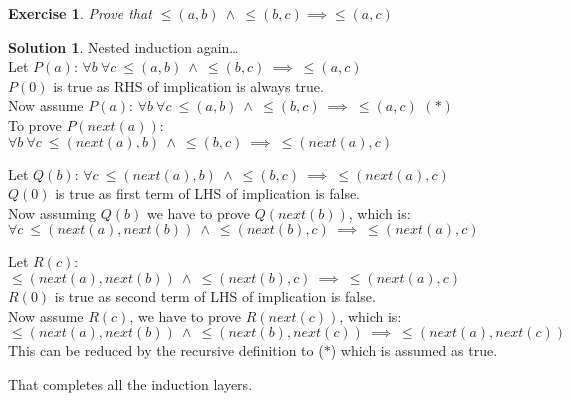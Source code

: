 \documentclass[a4paper,10pt]{article}
\newtheorem{exercise}{Exercise}[section]
\theoremstyle{definition} %
\newtheorem*{solution}{Solution}
\begin{document}
    \begin{exercise}
        Prove that $\leq(a,b) \ \land \ \leq(b,c) \implies \leq(a,c)$
    \end{exercise}
    \begin{solution}
        Nested induction again\dots \\
        Let $P(a)$: $\forall b \ \forall c \ \leq(a,b) \ \land \ \leq(b,c) \ \implies \ \leq(a,c)$ \\
        $P(0)$ is true as RHS of implication is always true. \\
        Now assume $P(a)$: $\forall b \ \forall c \ \leq(a,b) \ \land \ \leq(b,c) \ \implies \ \leq(a,c)$ \quad $(\ast)$ \\
        To prove $P(next(a))$: $\forall b \ \forall c \ \leq(next(a),b) \ \land \ \leq(b,c) \ \implies \ \leq(next(a),c)$
        \begin{adjustwidth}{1cm}{0cm}
            Let $Q(b)$: $\forall c \ \leq(next(a),b) \ \land \ \leq(b,c) \ \implies \ \leq(next(a),c)$ \\
            $Q(0)$ is true as first term of LHS of implication is false. \\
            Now assuming $Q(b)$ we have to prove $Q(next(b))$, which is: \\
            $\forall c \ \leq(next(a),next(b)) \ \land \ \leq(next(b),c) \ \implies \ \leq(next(a),c)$
            \begin{adjustwidth}{1cm}{0cm}
                Let $R(c)$: $\leq(next(a),next(b)) \ \land \ \leq(next(b),c) \ \implies \ \leq(next(a),c)$ \\
                $R(0)$ is true as second term of LHS of implication is false. \\
                Now assume $R(c)$, we have to prove $R(next(c))$, which is: \\
                $\leq(next(a),next(b)) \ \land \ \leq(next(b),next(c)) \ \implies \ \leq(next(a),next(c))$ \\
                This can be reduced by the recursive definition to ($\ast$) which is assumed as true.
            \end{adjustwidth} 
        \end{adjustwidth}
        That completes all the induction layers.
    \end{solution}
\end{document}
